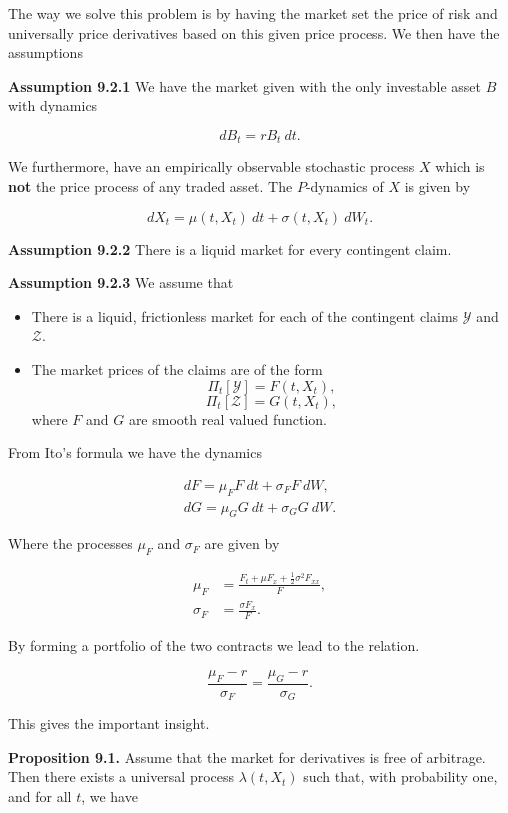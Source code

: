 \documentclass[
]{article}
\providecommand{\tightlist}{%
  \setlength{\itemsep}{0pt}\setlength{\parskip}{0pt}}
\begin{document}
The way we solve this problem is by having the market set the price of
risk and universally price derivatives based on this given price
process. We then have the assumptions

\textbf{Assumption 9.2.1} We have the market given with the only
investable asset \(B\) with dynamics

\[
dB_t=rB_t\ dt.
\]

We furthermore, have an empirically observable stochastic process \(X\)
which is \textbf{not} the price process of any traded asset. The
\(P\)-dynamics of \(X\) is given by

\[
dX_t=\mu(t,X_t)\ dt+\sigma(t,X_t)\ dW_t.
\]

\textbf{Assumption 9.2.2} There is a liquid market for every contingent
claim.

\textbf{Assumption 9.2.3} We assume that

\begin{itemize}
\tightlist
\item
  There is a liquid, frictionless market for each of the contingent
  claims \(\mathcal{Y}\) and \(\mathcal{Z}\).
\item
  The market prices of the claims are of the form
  \[ \Pi_t[\mathcal{Y}] = F(t,X_t),\]
  \[ \Pi_t[\mathcal{Z}] = G(t,X_t),\] where \(F\) and \(G\) are smooth
  real valued function.
\end{itemize}

From Ito's formula we have the dynamics

\begin{align*}
dF=\mu_F F\ dt+\sigma_F F\ dW,\\
dG=\mu_G G\ dt+\sigma_G G\ dW.
\end{align*}

Where the processes \(\mu_F\) and \(\sigma_F\) are given by

\begin{align*}
\mu_F&=\frac{F_t+\mu F_x+\frac{1}{2}\sigma^2 F_{xx}}{F},\\
\sigma_F&=\frac{\sigma F_x}{F}.
\end{align*}

By forming a portfolio of the two contracts we lead to the relation.

\[
\frac{\mu_F-r}{\sigma_F}=\frac{\mu_G-r}{\sigma_G}.
\]

This gives the important insight.

\textbf{Proposition 9.1.} Assume that the market for derivatives is free
of arbitrage. Then there exists a universal process \(\lambda(t,X_t)\)
such that, with probability one, and for all \(t\), we have
\end{document}
